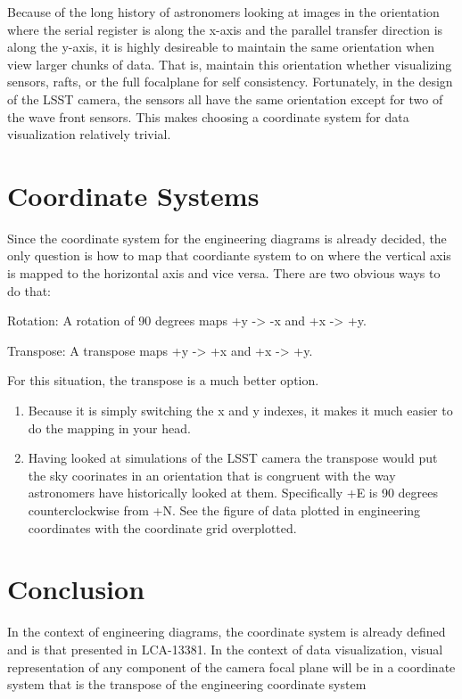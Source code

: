 \documentclass[SE,lsstdraft,toc]{lsstdoc}
\begin{document}
Because of the long history of astronomers looking at images in the orientation where the serial register is along the x-axis and the parallel transfer direction is along the y-axis, it is highly desireable to maintain the same orientation when view larger chunks of data. That is, maintain this orientation whether visualizing sensors, rafts, or the full focalplane for self consistency. Fortunately, in the design of the LSST camera, the sensors all have the same orientation except for two of the wave front sensors. This makes choosing a coordinate system for data visualization relatively trivial.

\section{Coordinate Systems}
Since the coordinate system for the engineering diagrams is already decided, the only question is how to map that coordiante system to on where the vertical axis is mapped to the horizontal axis and vice versa. There are two obvious ways to do that:

\begin{list}
\item Rotation: A rotation of 90 degrees maps +y -> -x and +x -> +y.
\item Transpose: A transpose maps +y -> +x and +x -> +y.
\end{list}

For this situation, the transpose is a much better option.

\begin{enumerate}
\item Because it is simply switching the x and y indexes, it makes it much easier to do the mapping in your head.
\item Having looked at simulations of the LSST camera the transpose would put the sky coorinates in an orientation that is congruent with the way astronomers have historically looked at them. Specifically +E is 90 degrees counterclockwise from +N. See the figure of data plotted in engineering coordinates with the coordinate grid overplotted.
\end{enumerate}

\section{Conclusion}
In the context of engineering diagrams, the coordinate system is already defined and is that presented in LCA-13381. In the context of data visualization, visual representation of any component of the camera focal plane will be in a coordinate system that is the transpose of the engineering coordinate system
\end{document}
